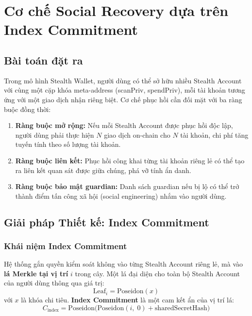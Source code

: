 \documentclass[../DoAn.tex]{subfiles}
\begin{document}
\section{Cơ chế Social Recovery dựa trên Index Commitment}
\label{sec:social_recovery_contrib}

\subsection{Bài toán đặt ra}
\label{subsec:recovery_problem}

Trong mô hình Stealth Wallet, người dùng có thể sở hữu nhiều Stealth Account với cùng một cặp khóa meta-address (scanPriv, spendPriv), mỗi tài khoản tương ứng với một giao dịch nhận riêng biệt. Cơ chế phục hồi cần đối mặt với ba ràng buộc đồng thời:

\begin{enumerate}
    \item \textbf{Ràng buộc mở rộng:} Nếu mỗi Stealth Account được phục hồi độc lập, người dùng phải thực hiện $N$ giao dịch on-chain cho $N$ tài khoản, chi phí tăng tuyến tính theo số lượng tài khoản.
    \item \textbf{Ràng buộc liên kết:} Phục hồi công khai từng tài khoản riêng lẻ có thể tạo ra liên kết quan sát được giữa chúng, phá vỡ tính ẩn danh.
    \item \textbf{Ràng buộc bảo mật guardian:} Danh sách guardian nếu bị lộ có thể trở thành điểm tấn công xã hội (social engineering) nhắm vào người dùng.
\end{enumerate}

\subsection{Giải pháp Thiết kế: Index Commitment}
\label{subsec:recovery_solution}

\subsubsection{Khái niệm Index Commitment}

Hệ thống gắn quyền kiểm soát không vào từng Stealth Account riêng lẻ, mà vào \textbf{lá Merkle tại vị trí} $i$ trong cây. Một lá đại diện cho toàn bộ Stealth Account của người dùng thông qua giá trị:
\[
    \text{Leaf}_i = \text{Poseidon}(x)
\]
với $x$ là khóa chi tiêu. \textbf{Index Commitment} là một cam kết ẩn của vị trí lá:
\[
    C_{\text{index}} = \text{Poseidon}\!\bigl(\text{Poseidon}(i,\; 0) + \text{sharedSecretHash}\bigr)
\]
\end{document}
